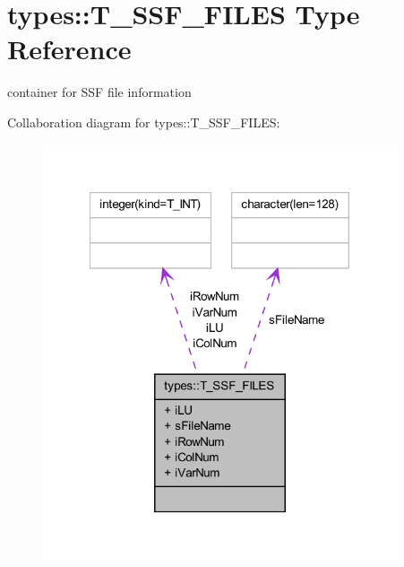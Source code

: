 \hypertarget{typetypes_1_1_t___s_s_f___f_i_l_e_s}{
\section{types::T\_\-SSF\_\-FILES Type Reference}
\label{typetypes_1_1_t___s_s_f___f_i_l_e_s}
}


container for SSF file information  




Collaboration diagram for types::T\_\-SSF\_\-FILES:\nopagebreak
\begin{figure}[H]
\begin{center}
\leavevmode
\includegraphics[width=296pt]{typetypes_1_1_t___s_s_f___f_i_l_e_s__coll__graph}
\end{center}
\end{figure}
